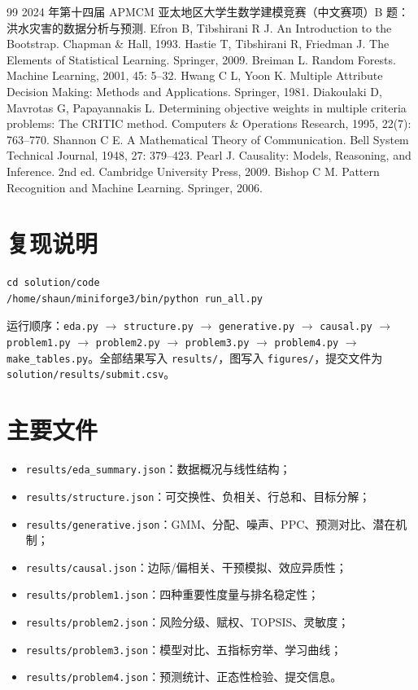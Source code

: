 \documentclass[12pt,a4paper]{ctexart}
\begin{document}
\begin{thebibliography}{99}
 2024 年第十四届 APMCM 亚太地区大学生数学建模竞赛（中文赛项）B 题：洪水灾害的数据分析与预测.
 Efron B, Tibshirani R J. An Introduction to the Bootstrap. Chapman \& Hall, 1993.
 Hastie T, Tibshirani R, Friedman J. The Elements of Statistical Learning. Springer, 2009.
 Breiman L. Random Forests. Machine Learning, 2001, 45: 5--32.
 Hwang C L, Yoon K. Multiple Attribute Decision Making: Methods and Applications. Springer, 1981.
 Diakoulaki D, Mavrotas G, Papayannakis L. Determining objective weights in multiple criteria problems: The CRITIC method. Computers \& Operations Research, 1995, 22(7): 763--770.
 Shannon C E. A Mathematical Theory of Communication. Bell System Technical Journal, 1948, 27: 379--423.
 Pearl J. Causality: Models, Reasoning, and Inference. 2nd ed. Cambridge University Press, 2009.
 Bishop C M. Pattern Recognition and Machine Learning. Springer, 2006.
\end{thebibliography}

\appendix
\section{复现说明}

\begin{verbatim}
cd solution/code
/home/shaun/miniforge3/bin/python run_all.py
\end{verbatim}

运行顺序：\texttt{eda.py} $\to$ \texttt{structure.py} $\to$ \texttt{generative.py} $\to$ \texttt{causal.py} $\to$ \texttt{problem1.py} $\to$ \texttt{problem2.py} $\to$ \texttt{problem3.py} $\to$ \texttt{problem4.py} $\to$ \texttt{make\_tables.py}。全部结果写入 \texttt{results/}，图写入 \texttt{figures/}，提交文件为 \texttt{solution/results/submit.csv}。

\section{主要文件}
\begin{itemize}
  \item \texttt{results/eda\_summary.json}：数据概况与线性结构；
  \item \texttt{results/structure.json}：可交换性、负相关、行总和、目标分解；
  \item \texttt{results/generative.json}：GMM、分配、噪声、PPC、预测对比、潜在机制；
  \item \texttt{results/causal.json}：边际/偏相关、干预模拟、效应异质性；
  \item \texttt{results/problem1.json}：四种重要性度量与排名稳定性；
  \item \texttt{results/problem2.json}：风险分级、赋权、TOPSIS、灵敏度；
  \item \texttt{results/problem3.json}：模型对比、五指标穷举、学习曲线；
  \item \texttt{results/problem4.json}：预测统计、正态性检验、提交信息。
\end{itemize}
\end{document}
